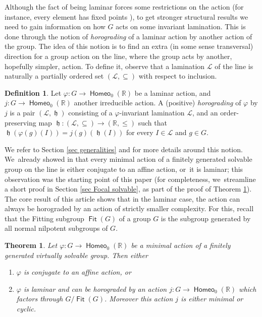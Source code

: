 \documentclass[JEP,XML,SOM,Unicode,NoFloatCountersInSection,published]{cedram}
\newtheorem{introthm}{Theorem}
\theoremstyle{definition}
\newtheorem{dfn}[thm]{Definition}
\DeclareMathOperator{\Fit}{\mathsf{Fit}}
\DeclareMathOperator{\homeo}{\mathsf{Homeo}}
\DeclareMathOperator{\hor}{\mathfrak{h}}
\newcommand{\R}{\mathbb{R}}
\newcommand{\Lcal}{\mathcal{L}}
\begin{document}
Although the fact of being laminar forces some restrictions on the action (for instance, every element has fixed points \cite[Lem.\,8.1.9]{BMRT}), to get stronger structural results we need to gain information on how $G$ acts on some invariant lamination. This is done through the notion of \emph{horograding} of a laminar action by another action of the group. The idea of this notion is to find an extra (in some sense transversal) direction for a group action on the line, where the group acts by another, hopefully simpler, action. To define it, observe that a lamination $\Lcal$ of the line is naturally a partially ordered set $(\Lcal, \subseteq)$ with respect to inclusion.

\begin{dfn}
Let $\varphi\colon G\to \homeo_0(\R)$ be a laminar action, and $j\colon G\to \homeo_0(\R)$ another irreducible action. A (positive) \emph{horograding} of $\varphi$ by $j$ is a pair $(\Lcal, \hor)$ consisting of a $\varphi$-invariant lamination $\Lcal$, and an order-preserving map $\hor \colon (\Lcal, \subseteq)\to (\R, \le)$ such that $\hor(\varphi(g)(I))=j(g)(\hor(I))$ for every $I\in \Lcal$ and $g\in G$.
\end{dfn}

We refer to Section \ref{sec generalities} and \cite[\S\S 8.2 \& 15.1]{BMRT} for more details around this notion. We~already showed in \cite[Th.\,8.3.8]{BMRT} that every minimal action of a finitely generated solvable group on the line is either conjugate to an affine action, or~it is laminar; this observation was the starting point of this paper (for completeness, we~streamline a short proof in Section \ref{sec Focal solvable}, as part of the proof of Theorem \ref{t-main}). The core result of this article shows that in the laminar case, the action can always be horograded by an action of strictly smaller complexity.
For this, recall that the Fitting subgroup $\Fit(G)$ of a group $G$ is the subgroup generated by all normal nilpotent subgroups of $G$.

\begin{introthm} \label{t-main}
Let $\varphi\colon G\to \homeo_0(\R)$ be a minimal action of a finitely generated virtually solvable group. Then either
\begin{enumerate}
\item $\varphi$ is conjugate to an affine action, or
\item \label{main-i-focal} $\varphi$ is laminar and can be horograded by an action $j\colon G\to \homeo_0(\R)$ which factors through $G/\Fit(G)$. Moreover this action $j$ is either minimal or cyclic.
\end{enumerate}
\end{introthm}
\end{document}
